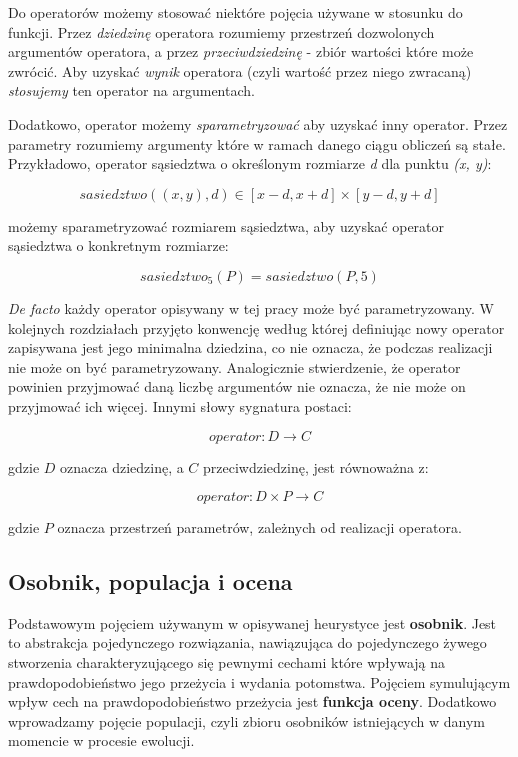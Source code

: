 \documentclass[twoside]{iisthesis}
\newcommand{\Defacto}{\emph{De facto }}
\begin{document}
Do operatorów możemy stosować niektóre pojęcia używane w stosunku do funkcji. Przez \emph{dziedzinę} operatora rozumiemy przestrzeń dozwolonych argumentów operatora, a przez \emph{przeciwdziedzinę} - zbiór wartości które może zwrócić. Aby uzyskać \emph{wynik} operatora (czyli wartość przez niego zwracaną) \emph{stosujemy} ten operator na argumentach.

Dodatkowo, operator możemy \emph{sparametryzować} aby uzyskać inny operator. Przez parametry rozumiemy argumenty które w ramach danego ciągu obliczeń są stałe. Przykładowo, operator sąsiedztwa o określonym rozmiarze \emph{d} dla punktu \emph{(x, y)}:

\begin{displaymath}
	sasiedztwo((x, y), d) \in [x-d, x+d] \times [y-d, y+d]
\end{displaymath}

możemy sparametryzować rozmiarem sąsiedztwa, aby uzyskać operator sąsiedztwa o konkretnym rozmiarze:

\begin{displaymath}
sasiedztwo_5 (P) = sasiedztwo (P, 5)
\end{displaymath}

\Defacto każdy operator opisywany w tej pracy może być parametryzowany. W kolejnych rozdziałach przyjęto konwencję według której definiując nowy operator zapisywana jest jego minimalna dziedzina, co nie oznacza, że podczas realizacji nie może on być parametryzowany. Analogicznie stwierdzenie, że operator powinien przyjmować daną liczbę argumentów nie oznacza, że nie może on przyjmować ich więcej. Innymi słowy sygnatura postaci:

\begin{displaymath}
operator: D \rightarrow C
\end{displaymath}

gdzie $D$ oznacza dziedzinę, a $C$ przeciwdziedzinę, jest równoważna z:

\begin{displaymath}
operator: D \times P \rightarrow C
\end{displaymath}

gdzie $P$ oznacza przestrzeń parametrów, zależnych od realizacji operatora.

\subsection{Osobnik, populacja i ocena}

Podstawowym pojęciem używanym w opisywanej heurystyce jest \textbf{osobnik}. Jest to abstrakcja pojedynczego rozwiązania, nawiązująca do pojedynczego żywego stworzenia charakteryzującego się pewnymi cechami które wpływają na prawdopodobieństwo jego przeżycia i wydania potomstwa. Pojęciem symulującym wpływ cech na prawdopodobieństwo przeżycia jest \textbf{funkcja oceny}. Dodatkowo wprowadzamy pojęcie populacji, czyli zbioru osobników istniejących w danym momencie w procesie ewolucji.
\end{document}
